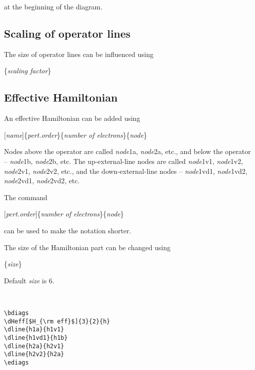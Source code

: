\documentclass[a4paper]{article}
\newcommand{\myind}{\hspace{10pt}}
\begin{document}
\myind{\bf \textbackslash dfeynman}

at the beginning of the diagram.

\subsection{Scaling of operator lines}

The size of operator lines can be influenced using

\myind{\bf \textbackslash dscaleop}\{{\it scaling factor}\}

\subsection{Effective Hamiltonian}

An effective Hamiltonian can be added using

\myind{\bf \textbackslash dHeff}[{\it name}]\{{\it pert.order}\}\{{\it number of electrons}\}\{{\it node}\}

Nodes above the operator are called {\it node}1a, {\it node}2a, etc., 
and below the operator -- {\it node}1b, {\it node}2b, etc.
The up-external-line nodes are called {\it node}1v1, {\it node}1v2, {\it node}2v1, {\it node}2v2, etc.,
and the down-external-line nodes -- {\it node}1vd1, {\it node}1vd2, {\it node}2vd1, {\it node}2vd2, etc.

The command

\myind{\bf \textbackslash dHeffs}[{\it pert.order}]\{{\it number of electrons}\}\{{\it node}\}

can be used to make the notation shorter.

The size of the Hamiltonian part can be changed using

\myind{\bf \textbackslash dheffsize}\{{\it size}\}

Default {\it size} is 6.
 
~\\
 \begin{minipage}[b]{0.55\linewidth}\centering
  \begin{lstlisting}
\bdiags
\dHeff[$H_{\rm eff}$]{3}{2}{h}
\dline{h1a}{h1v1}
\dline{h1vd1}{h1b}
\dline{h2a}{h2v1}
\dline{h2v2}{h2a}
\ediags
  \end{lstlisting}
 \end{minipage}
 \begin{minipage}[b]{0.45\linewidth}\centering
\bdiags
{}
\ediags
 \end{minipage}
\end{document}
